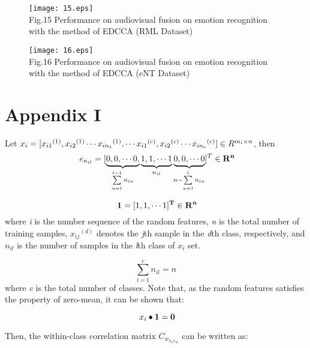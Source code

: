 \documentclass[journal]{IEEEtran}
\begin{document}
\begin{figure*}[t]
\centering
\texttt{[image: 15.eps]}\\ Fig.15 Performance on audiovisual fusion on emotion recognition with the method of EDCCA
(RML Dataset)\\
\end{figure*}

\begin{figure*}[t]
\centering
\texttt{[image: 16.eps]}\\ Fig.16 Performance on audiovisual fusion on emotion recognition with the method of EDCCA
(eNT Dataset)\\
\end{figure*}

\section*{Appendix I}
Let ${x_i} = [{x_{i1}}^{(1)},{x_{i2}}^{(1)} \cdots {x_{i{n_1}}}^{(1)}, \cdots {x_{i1}}^{(c)},{x_{i2}}^{(c)} \cdots {x_{i{n_c}}}^{(c)}] \\ \in {R^{{m_i} \times n}}$, then
\begin{equation} \ e_{{n_{il}}} = {[\underbrace {0,0, \cdots 0,}_{\sum\limits_{u = 1}^{l - 1} {{n_{iu}}} }\underbrace {1,1, \cdots 1}_{{n_{il}}}\underbrace {0,0, \cdots 0}_{n - \sum\limits_{u = 1}^l {{n_{iu}}} }]^T} \in {{\bf{R}}^{\bf{n}}} \end{equation}

 \begin{equation} \ {\bf{1}} = {[1,1, \cdots 1]^{\bf{T}}} \in {{\bf{R}}^{\bf{n}}} \end{equation}
 where \emph{i} is the number sequence of the random features, \emph{n} is the total number of training samples, ${x_{ij}}^{(d)}$  denotes the \emph{j}th sample in the \emph{d}th class, respectively, and ${n_{il}}$ is the number of samples in the \emph{l}th class of ${x_i}$ set.

\begin{equation} \sum\limits_{l = 1}^c {{n_{il}}}  = n \end{equation}
where \emph{c} is the total number of classes. Note that, as the random features satisfies the property of zero-mean, it can be shown that:

\begin{equation} \ x_i  \bullet  {\bf{1}} = {\bf{0}} \end{equation}

Then, the within-class correlation matrix ${C_{{w_{{x_k}{x_m}}}}}$ can be written as:
\end{document}
